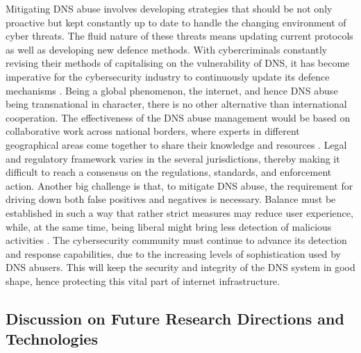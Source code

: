 Mitigating DNS abuse involves developing strategies that should be not only proactive but kept constantly up to date to handle the changing environment of cyber threats. The fluid nature of these threats means updating current protocols as well as developing new defence methods. With cybercriminals constantly revising their methods of capitalising on the vulnerability of DNS, it has become imperative for the cybersecurity industry to continuously update its defence mechanisms \cite{bhattacharya2023dns}. Being a global phenomenon, the internet, and hence DNS abuse being transnational in character, there is no other alternative than international cooperation. The effectiveness of the DNS abuse management would be based on collaborative work across national borders, where experts in different geographical areas come together to share their knowledge and resources \cite{altulaihan2022cybersecurity}. Legal and regulatory framework varies in the several jurisdictions, thereby making it difficult to reach a consensus on the regulations, standards, and enforcement action. Another big challenge is that, to mitigate DNS abuse, the requirement for driving down both false positives and negatives is necessary. Balance must be established in such a way that rather strict measures may reduce user experience, while, at the same time, being liberal might bring less detection of malicious activities . The cybersecurity community must continue to advance its detection and response capabilities, due to the increasing levels of sophistication used by DNS abusers. This will keep the security and integrity of the DNS system in good shape, hence protecting this vital part of internet infrastructure.

\subsection{Discussion on Future Research Directions and Technologies}

